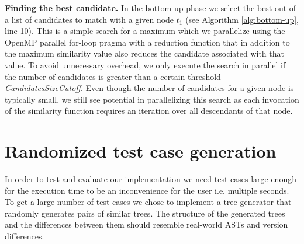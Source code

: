 \documentclass[letterpaper]{article}
\newcommand{\mypar}[1]{{\bf #1.}}
\begin{document}
\mypar{Finding the best candidate}
In the bottom-up phase we select the best out of a list of candidates to match with a given node $t_1$ (see Algorithm \ref{alg:bottom-up}, line 10).
This is a simple search for a maximum which we parallelize using the OpenMP parallel for-loop pragma with a reduction function that in addition to the maximum similarity value also reduces the candidate associated with that value.
To avoid unnecessary overhead, we only execute the search in parallel if the number of candidates is greater than a certain threshold \emph{CandidatesSizeCutoff}.
Even though the number of candidates for a given node is typically small, we still see potential in parallelizing this search as each invocation of the similarity function requires an iteration over all descendants of that node.

\section{Randomized test case generation}

In order to test and evaluate our implementation we need test cases large enough for the execution time to be an inconvenience for the user i.e. multiple seconds.
To get a large number of test cases we chose to implement a tree generator that randomly generates pairs of similar trees.
The structure of the generated trees and the differences between them should resemble real-world ASTs and version differences.
\end{document}
